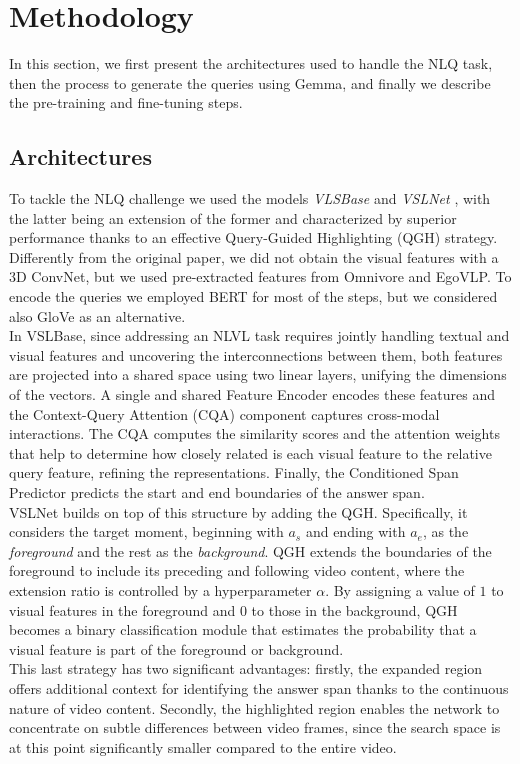 \documentclass[10pt,twocolumn,letterpaper]{article}
\begin{document}
\section{Methodology}
In this section, we first present the architectures used to handle the NLQ task, then the process to generate the queries using Gemma, and finally we describe the pre-training and fine-tuning steps.

\subsection{Architectures}
To tackle the NLQ challenge we used the models \textit{VLSBase} and \textit{VSLNet} \cite{zhang2020spanbasedlocalizingnetworknatural}, with the latter being an extension of the former and characterized by superior performance thanks to an effective Query-Guided Highlighting (QGH) strategy.\\
Differently from the original paper, we did not obtain the visual features with a 3D ConvNet, but we used pre-extracted features from Omnivore and EgoVLP.
To encode the queries we employed BERT for most of the steps, but we considered also GloVe as an alternative.\\
In VSLBase, since addressing an NLVL task requires jointly handling textual and visual features and uncovering the interconnections between them, both features are projected into a shared space using two linear layers, unifying the dimensions of the vectors. A single and shared Feature Encoder encodes these features and the Context-Query Attention (CQA) component captures cross-modal interactions. The CQA computes the similarity scores and the attention weights that help to determine how closely related is each visual feature to the relative query feature, refining the representations. Finally, the Conditioned Span Predictor predicts the start and end boundaries of the answer span. \\
VSLNet builds on top of this structure by adding the QGH. Specifically, it considers the target moment, beginning with $a_s$ and ending with $a_e$, as the \textit{foreground} and the rest as the \textit{background}. QGH extends the boundaries of the foreground to include its preceding and following video content, where the extension ratio is controlled by a hyperparameter $\alpha$.
By assigning a value of \(1\) to visual features in the foreground and \(0\) to those in the background, QGH becomes a binary classification module that estimates the probability that a visual feature is part of the foreground or background.\\
This last strategy has two significant advantages: firstly, the expanded region offers additional context for identifying the answer span thanks to the continuous nature of video content. Secondly, the highlighted region enables the network to concentrate on subtle differences between video frames, since the search space is at this point significantly smaller compared to the entire video.
\end{document}
